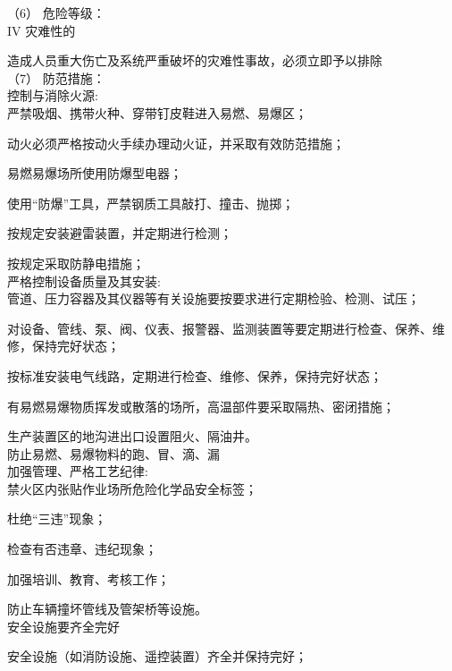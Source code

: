 （6） 危险等级：\\

IV 灾难性的

造成人员重大伤亡及系统严重破坏的灾难性事故，必须立即予以排除\\

（7） 防范措施：\\

控制与消除火源:\\

 严禁吸烟、携带火种、穿带钉皮鞋进入易燃、易爆区；

 动火必须严格按动火手续办理动火证，并采取有效防范措施；

 易燃易爆场所使用防爆型电器；

 使用“防爆”工具，严禁钢质工具敲打、撞击、抛掷；

 按规定安装避雷装置，并定期进行检测；

 按规定采取防静电措施；\\

严格控制设备质量及其安装:\\

 管道、压力容器及其仪器等有关设施要按要求进行定期检验、检测、试压；

 对设备、管线、泵、阀、仪表、报警器、监测装置等要定期进行检查、保养、维修，保持完好状态；

 按标准安装电气线路，定期进行检查、维修、保养，保持完好状态；

 有易燃易爆物质挥发或散落的场所，高温部件要采取隔热、密闭措施；

 生产装置区的地沟进出口设置阻火、隔油井。\\

防止易燃、易爆物料的跑、冒、滴、漏\\

加强管理、严格工艺纪律:\\

 禁火区内张贴作业场所危险化学品安全标签；

 杜绝“三违”现象；

 检查有否违章、违纪现象；

 加强培训、教育、考核工作；

 防止车辆撞坏管线及管架桥等设施。\\

安全设施要齐全完好

 安全设施（如消防设施、遥控装置）齐全并保持完好；


